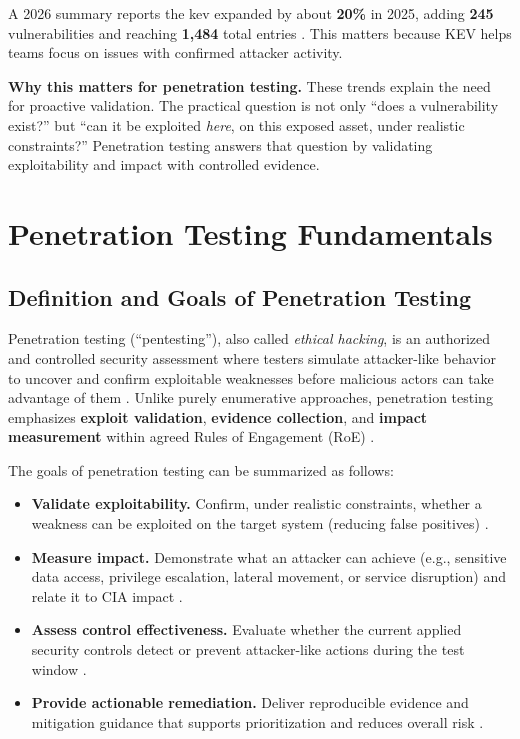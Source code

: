 A 2026 summary reports the \gls{kev} expanded by about \textbf{20\%} in 2025, adding \textbf{245} vulnerabilities and reaching \textbf{1,484} total entries \cite{securityweekKEV2026}.
This matters because KEV helps teams focus on issues with confirmed attacker activity.

\textbf{Why this matters for penetration testing.}
These trends explain the need for proactive validation. The practical question is not only ``does a vulnerability exist?'' but ``can it be exploited \emph{here}, on this exposed asset, under realistic constraints?'' Penetration testing answers that question by validating exploitability and impact with controlled evidence.



\section{Penetration Testing Fundamentals}
\label{subsec:ch1-pentest}

\subsection{Definition and Goals of Penetration Testing}
\label{subsubsec:ch1-pentest-definition}

Penetration testing (``pentesting''), also called \textit{ethical hacking}, is an authorized and controlled security assessment
where testers simulate attacker-like behavior to uncover and confirm exploitable weaknesses before malicious actors can take advantage of them
\cite{nistPenTest,nistSP800115,doiPenTest}. Unlike purely enumerative approaches, penetration testing emphasizes
\textbf{exploit validation}, \textbf{evidence collection}, and \textbf{impact measurement} within agreed Rules of Engagement (RoE)
\cite{nistSP800115}.

The goals of penetration testing can be summarized as follows:
\begin{itemize}
  \item \textbf{Validate exploitability.} Confirm, under realistic constraints, whether a weakness can be exploited on the target
  system (reducing false positives) \cite{nistSP800115}.
  \item \textbf{Measure impact.} Demonstrate what an attacker can achieve (e.g., sensitive data access, privilege escalation,
  lateral movement, or service disruption) and relate it to CIA impact \cite{nistSP800115}.
  \item \textbf{Assess control effectiveness.} Evaluate whether the current applied security controls detect or prevent attacker-like actions during the test window \cite{nistSP800115}.
  \item \textbf{Provide actionable remediation.} Deliver reproducible evidence and mitigation guidance that supports prioritization and
  reduces overall risk \cite{nistSP800115,doiPenTest}.
\end{itemize}


